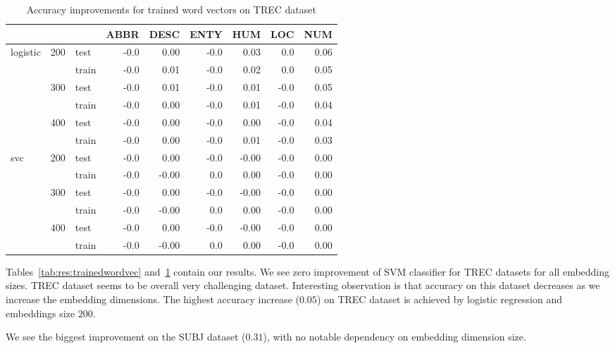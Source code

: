     \begin{table}[H]
    \begin{center}
    
    \begin{tabular}{lllrrrrrr}
    \toprule
     & &&ABBR &DESC &ENTY &HUM &LOC &NUM \\
    \midrule
    logistic & 200 & test &-0.0 &0.00 &-0.0 & 0.03 &0.0 & 0.06 \\
     & & train &-0.0 &0.01 &-0.0 & 0.02 &0.0 & 0.05 \\
     & 300 & test &-0.0 &0.01 &-0.0 & 0.01 & -0.0 & 0.05 \\
     & & train &-0.0 &0.00 &-0.0 & 0.01 & -0.0 & 0.04 \\
     & 400 & test &-0.0 &0.00 &-0.0 & 0.00 & -0.0 & 0.04 \\
     & & train &-0.0 &0.00 &-0.0 & 0.01 & -0.0 & 0.03 \\
    svc & 200 & test &-0.0 &0.00 &-0.0 &-0.00 & -0.0 & 0.00 \\
     & & train &-0.0 & -0.00 & 0.0 & 0.00 & -0.0 & 0.00 \\
     & 300 & test &-0.0 &0.00 &-0.0 &-0.00 & -0.0 & 0.00 \\
     & & train &-0.0 & -0.00 & 0.0 & 0.00 & -0.0 & 0.00 \\
     & 400 & test &-0.0 &0.00 &-0.0 &-0.00 & -0.0 & 0.00 \\
     & & train &-0.0 & -0.00 & 0.0 & 0.00 & -0.0 & 0.00 \\
    \bottomrule
    \end{tabular}
    
    \caption[Accuracy improvements for trained word vectors on TREC dataset]{Accuracy improvements for trained word vectors on TREC dataset}
    \label{tab:res:trainedwordvec:trec}
    \end{center}
    \end{table}


    Tables~\ref{tab:res:trainedwordvec} and~\ref{tab:res:trainedwordvec:trec} contain our results.
    We see zero improvement of SVM classifier for TREC datasets for all embedding sizes.
    TREC dataset seems to be overall very challenging dataset.
    Interesting observation is that accuracy on this dataset decreases as we increase the embedding dimensions.
    The highest accuracy increase ($0.05$) on TREC dataset is achieved by logistic regression and embeddings size $200$. 
    
    We see the biggest improvement on the SUBJ dataset ($0.31$), with no notable dependency on embedding dimension size.  
    
